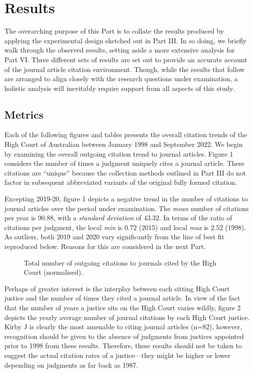 \let\xn\xnote
\section{Results}

The overarching purpose of this Part is to collate the results produced by applying the experimental design sketched out in Part III. In so doing, we briefly walk through the observed results, setting aside a more extensive analysis for Part VI. Three different sets of results are set out to provide an accurate account of the journal article citation environment. Though, while the results that follow are arranged to align closely with the research questions under examination, a holistic analysis will inevitably require support from all aspects of this study.

\subsection{Metrics}

Each of the following figures and tables presents the overall citation trends of the High Court of Australian between January 1998 and September 2022. We begin by examining the overall outgoing citation trend to journal articles. Figure 1 considers the number of times a judgment uniquely cites a journal article. These citations are ``unique'' because the collection methods outlined in Part III do not factor in subsequent abbreviated variants of the original fully formed citation.

Excepting 2019-20, figure 1 depicts a negative trend in the number of citations to journal articles over the period under examination. The \emph{mean} number of citations per year is $90.88$, with a \emph{standard deviation} of $43.32$. In terms of the ratio of citations per judgment, the local \emph{min} is $0.72$ (2015) and local \emph{max} is $2.52$ (1998). As outliers, both 2019 and 2020 vary significantly from the line of best fit reproduced below. Reasons for this are considered in the next Part.

\begin{figure}[!htpb]
    \centering
    \makebox[\textwidth][c]{}
    \caption{Total number of outgoing citations to journals cited by the High Court (normalised).}
\end{figure}

Perhaps of greater interest is the interplay between each sitting High Court justice and the number of times they cited a journal article. In view of the fact that the number of years a justice sits on the High Court varies wildly, figure 2 depicts the yearly average number of journal citations by each High Court justice. Kirby J is clearly the most amenable to citing journal articles (n=$82$), however, recognition should be given to the absence of judgments from justices appointed prior to 1998 from these results.\xn{5-1} Therefore, these results should not be taken to suggest the actual citation rates of a justice---they might be higher or lower depending on judgments as far back as 1987.

